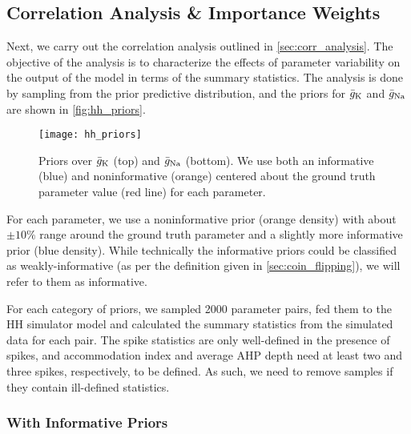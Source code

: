 \subsection{Correlation Analysis \& Importance Weights}

Next, we carry out the correlation analysis outlined in \cref{sec:corr_analysis}. The objective of the analysis is to characterize the effects of parameter variability on the output of the model in terms of the summary statistics. The analysis is done by sampling from the prior predictive distribution, and the priors for $\bar{g}_{\mathrm{K}}$ and $\bar{g}_{\mathrm{Na}}$ are shown in \autoref{fig:hh_priors}. 
\begin{figure}[!htb]
    \centering
    \texttt{[image: hh\_priors]}
    \caption{Priors over $\bar{g}_{\mathrm{K}}$ (top) and $\bar{g}_{\mathrm{Na}}$ (bottom). We use both an informative (blue) and noninformative (orange) centered about the ground truth parameter value (red line) for each parameter.}
    \label{fig:hh_priors}
\end{figure}
For each parameter, we use a noninformative prior (orange density) with about $\pm 10\%$ range around the ground truth parameter and a slightly more informative prior (blue density). While technically the informative priors could be classified as weakly-informative (as per the definition given in \cref{sec:coin_flipping}), we will refer to them as informative. 

For each category of priors, we sampled 2000 parameter pairs, fed them to the HH simulator model and calculated the summary statistics from the simulated data for each pair. The spike statistics are only well-defined in the presence of spikes, and accommodation index and average AHP depth need at least two and three spikes, respectively, to be defined. As such, we need to remove samples if they contain ill-defined statistics.

\subsubsection*{With Informative Priors}

